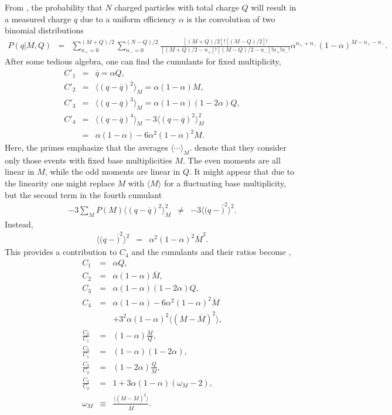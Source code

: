 \documentclass[aps,prc,nofootinbib,showpacs,superscriptaddress,groupedaddress]{revtex4-1}
\begin{document}
From \cite{Savchuk:2019xfg}, the probability that $N$ charged particles with total charge $Q$ will result in a measured charge $q$ due to a uniform efficiency $\alpha$ is the convolution of two binomial distributions
\begin{eqnarray}
P(q|M,Q)&=&\sum_{n_+=0}^{(M+Q)/2}\sum_{n_-=0}^{(N-Q)/2}\frac{[(M+Q)/2]![(M-Q)/2]!}{[(M+Q)/2-n_+]![(M-Q)/2-n_-]!n_+!n_-!}
\alpha^{n_++n_-}(1-\alpha)^{M-n_+-n_-}.
\end{eqnarray}
After some tedious algebra, one can find the cumulants for fixed multiplicity,
\begin{eqnarray}
C'_1&=&\overline{q}=\alpha Q,\\
\nonumber
C'_2&=&\langle (q-\overline{q})^2\rangle_M = \alpha(1-\alpha)M,\\
\nonumber
C'_3&=&\langle (q-\overline{q})^3\rangle_M = \alpha(1-\alpha)(1-2\alpha)Q,\\
\nonumber
C'_4&=&\langle(q-\overline{q})^4\rangle_M -3\langle(q-\overline{q})^2\rangle_M^2\\
\nonumber
&=&\alpha(1-\alpha)-6\alpha^2(1-\alpha)^2M.
\end{eqnarray}
Here, the primes emphasize that the averages $\langle\cdots\rangle_M$. denote that they consider only those events with fixed base multiplicities $M$. The even moments are all linear in $M$, while the odd moments are linear in $Q$. It might appear that due to the linearity one might replace $M$ with $\langle M\rangle$ for a fluctuating base multiplicity, but the second term in the fourth cumulant
\begin{eqnarray}
-3\sum_M P(M) \langle(q-\overline{q})^2\rangle_M^2 &\ne&
-3\langle(q-\bar)^2\rangle^2.
\end{eqnarray}
Instead,
\begin{eqnarray}
\langle(q-\bar)^2\rangle^2&=&\alpha^2(1-\alpha)^2\overline{M}^2.
\end{eqnarray}
This provides a contribution to $C_4$ and the cumulants and their ratios become \cite{Savchuk:2019xfg},
\begin{eqnarray}
\label{eq:savchuck}
C_1&=&\alpha Q,\\
\nonumber
C_2&=&\alpha(1-\alpha)\overline{M},\\
\nonumber
C_3&=&\alpha(1-\alpha)(1-2\alpha)Q,\\
\nonumber
C_4&=&\alpha(1-\alpha)-6\alpha^2(1-\alpha)^2\overline{M}\\
\nonumber
&&+3^2\alpha(1-\alpha)^2\langle(M-\overline{M})^2\rangle,\\
\nonumber
\frac{C_2}{C_1}&=&(1-\alpha)\frac{\overline{M}}{Q},\\
\nonumber
\frac{C_3}{C_1}&=&(1-\alpha)(1-2\alpha),\\
\nonumber
\frac{C_3}{C_2}&=&(1-2\alpha)\frac{Q}{\overline{M}},\\
\nonumber
\frac{C_4}{C_2}&=&1+3\alpha(1-\alpha)(\omega_M-2),\\
\nonumber
\omega_M&\equiv&\frac{\langle(M-\overline{M})^2\rangle}{\overline{M}}.
\end{eqnarray}
\end{document}
